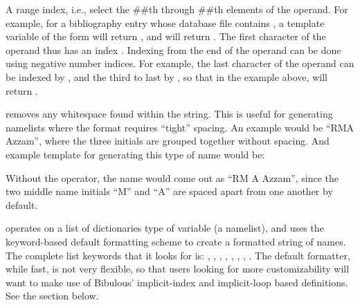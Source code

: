 \documentclass[letterpaper,10pt,english]{sphinxmanual}
\begin{document}
 A range index, i.e., select the \#\#th through \#\#th elements of the operand. For example, for a bibliography entry whose database file contains , a template variable of the form  will return , and  will return . The first character of the operand thus has an index . Indexing from the end of the operand can be done using negative number indices. For example, the last character of the operand can be indexed by , and the third to last by , so that in the example above,  will return .

 removes any whitespace found within the string. This is useful for generating namelists where the format requires “tight” spacing. An example would be “RMA Azzam”, where the three initials are grouped together without spacing. And example template for generating this type of name would be:

%
\begin{sphinxVerbatim}[commandchars=\\\{\}]
 
\end{sphinxVerbatim}

Without the  operator, the name would come out as “RM A Azzam”, since the two middle name initials “M” and “A” are spaced apart from one another by default.

 operates on a list of dictionaries type of variable (a namelist), and uses the keyword-based default formatting scheme to create a formatted string of names. The complete list keywords that it looks for is: , , , , , , , . The default formatter, while fast, is not very flexible, so that users looking for more customizability will want to make use of Bibulous’ implicit-index and implicit-loop based definitions. See the  section below.
\end{document}
